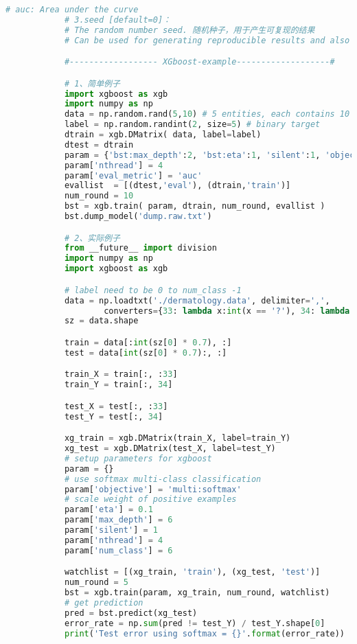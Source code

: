 \begin{lstlisting}[language = Python]
            # auc: Area under the curve
            # 3.seed [default=0]：
            # The random number seed. 随机种子，用于产生可复现的结果
            # Can be used for generating reproducible results and also for parameter tuning.

            #------------------ XGboost-example-------------------#

            # 1、简单例子
            import xgboost as xgb
            import numpy as np
            data = np.random.rand(5,10) # 5 entities, each contains 10 features
            label = np.random.randint(2, size=5) # binary target
            dtrain = xgb.DMatrix( data, label=label)
            dtest = dtrain
            param = {'bst:max_depth':2, 'bst:eta':1, 'silent':1, 'objective':'binary:logistic' }
            param['nthread'] = 4
            param['eval_metric'] = 'auc'
            evallist  = [(dtest,'eval'), (dtrain,'train')]
            num_round = 10
            bst = xgb.train( param, dtrain, num_round, evallist )
            bst.dump_model('dump.raw.txt')

            # 2、实际例子
            from __future__ import division
            import numpy as np
            import xgboost as xgb

            # label need to be 0 to num_class -1
            data = np.loadtxt('./dermatology.data', delimiter=',',
                    converters={33: lambda x:int(x == '?'), 34: lambda x:int(x)-1})
            sz = data.shape

            train = data[:int(sz[0] * 0.7), :]
            test = data[int(sz[0] * 0.7):, :]

            train_X = train[:, :33]
            train_Y = train[:, 34]

            test_X = test[:, :33]
            test_Y = test[:, 34]

            xg_train = xgb.DMatrix(train_X, label=train_Y)
            xg_test = xgb.DMatrix(test_X, label=test_Y)
            # setup parameters for xgboost
            param = {}
            # use softmax multi-class classification
            param['objective'] = 'multi:softmax'
            # scale weight of positive examples
            param['eta'] = 0.1
            param['max_depth'] = 6
            param['silent'] = 1
            param['nthread'] = 4
            param['num_class'] = 6

            watchlist = [(xg_train, 'train'), (xg_test, 'test')]
            num_round = 5
            bst = xgb.train(param, xg_train, num_round, watchlist)
            # get prediction
            pred = bst.predict(xg_test)
            error_rate = np.sum(pred != test_Y) / test_Y.shape[0]
            print('Test error using softmax = {}'.format(error_rate))


\end{lstlisting}
